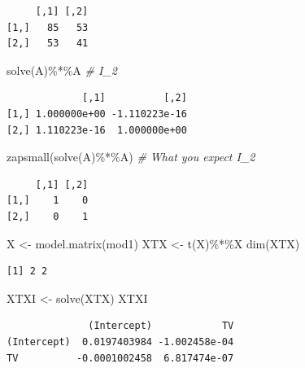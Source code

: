 \documentclass[
]{article}
\newenvironment{Shaded}{\begin{snugshade}}{\end{snugshade}}
\newcommand{\CommentTok}[1]{\textcolor[rgb]{0.56,0.35,0.01}{\textit{#1}}}
\newcommand{\FunctionTok}[1]{\textcolor[rgb]{0.00,0.00,0.00}{#1}}
\newcommand{\NormalTok}[1]{#1}
\newcommand{\OtherTok}[1]{\textcolor[rgb]{0.56,0.35,0.01}{#1}}
\newcommand{\SpecialCharTok}[1]{\textcolor[rgb]{0.00,0.00,0.00}{#1}}
\begin{document}
\begin{verbatim}
     [,1] [,2]
[1,]   85   53
[2,]   53   41
\end{verbatim}

\begin{Shaded}
\begin{Highlighting}[]
\FunctionTok{solve}\NormalTok{(A)}\SpecialCharTok{\%*\%}\NormalTok{A  }\CommentTok{\# I\_2}
\end{Highlighting}
\end{Shaded}

\begin{verbatim}
             [,1]          [,2]
[1,] 1.000000e+00 -1.110223e-16
[2,] 1.110223e-16  1.000000e+00
\end{verbatim}

\begin{Shaded}
\begin{Highlighting}[]
\FunctionTok{zapsmall}\NormalTok{(}\FunctionTok{solve}\NormalTok{(A)}\SpecialCharTok{\%*\%}\NormalTok{A)  }\CommentTok{\# What you expect I\_2}
\end{Highlighting}
\end{Shaded}

\begin{verbatim}
     [,1] [,2]
[1,]    1    0
[2,]    0    1
\end{verbatim}

\begin{Shaded}
\begin{Highlighting}[]
\NormalTok{X }\OtherTok{\textless{}{-}} \FunctionTok{model.matrix}\NormalTok{(mod1)}
\NormalTok{XTX }\OtherTok{\textless{}{-}} \FunctionTok{t}\NormalTok{(X)}\SpecialCharTok{\%*\%}\NormalTok{X}
\FunctionTok{dim}\NormalTok{(XTX)}
\end{Highlighting}
\end{Shaded}

\begin{verbatim}
[1] 2 2
\end{verbatim}

\begin{Shaded}
\begin{Highlighting}[]
\NormalTok{XTXI }\OtherTok{\textless{}{-}} \FunctionTok{solve}\NormalTok{(XTX)}
\NormalTok{XTXI}
\end{Highlighting}
\end{Shaded}

\begin{verbatim}
              (Intercept)            TV
(Intercept)  0.0197403984 -1.002458e-04
TV          -0.0001002458  6.817474e-07
\end{verbatim}
\end{document}
